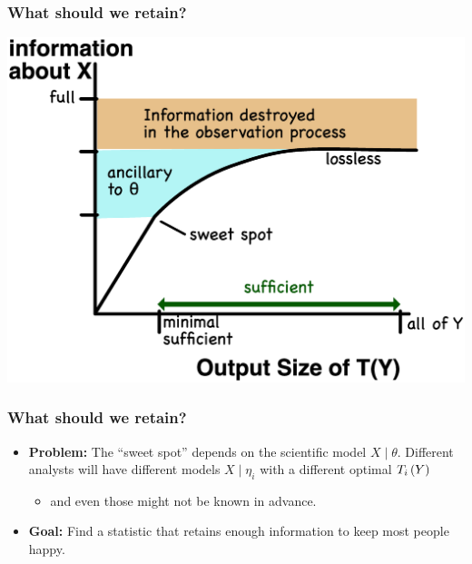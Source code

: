 \documentclass[10pt, compress]{beamer}
\begin{document}
\begin{frame}[fragile]
    \frametitle{What should we retain?}
    \includegraphics[width=\textwidth]{assets/information.eps}
\end{frame}

\begin{frame}[fragile]
    \frametitle{What should we retain?}
    \begin{itemize}
        \item \textbf{Problem:} The “sweet spot” depends on the scientific model $X \mid \theta$. Different analysts will have different models $X \mid \eta_i$ with a different optimal $T_i\del{Y}$
            \begin{itemize}
                \item and even those might not be known in advance.
            \end{itemize}
        \item \textbf{Goal:} Find a statistic that retains enough information to keep most people happy.
    \end{itemize}
\end{frame}
\end{document}
